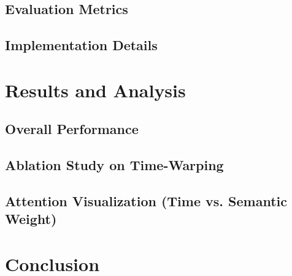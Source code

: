 \documentclass[sigconf]{acmart}
\begin{document}
\subsection{Evaluation Metrics}
\subsection{Implementation Details}

\section{Results and Analysis}
\subsection{Overall Performance}
\subsection{Ablation Study on Time-Warping}
\subsection{Attention Visualization (Time vs. Semantic Weight)}

\section{Conclusion}



\end{document}
